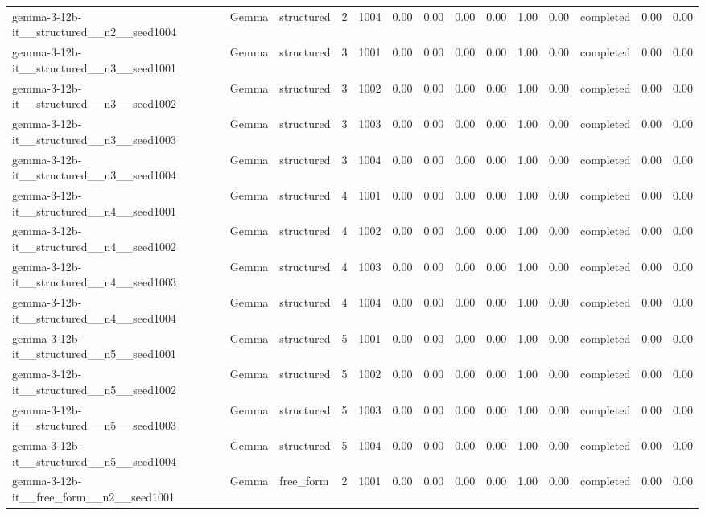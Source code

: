 \begin{longtable}{lllrrrrrrrrlrr}
gemma-3-12b-it\_\_structured\_\_n2\_\_seed1004 & Gemma & structured & 2 & 1004 & 0.00 & 0.00 & 0.00 & 0.00 & 1.00 & 0.00 & completed & 0.00 & 0.00 \\
gemma-3-12b-it\_\_structured\_\_n3\_\_seed1001 & Gemma & structured & 3 & 1001 & 0.00 & 0.00 & 0.00 & 0.00 & 1.00 & 0.00 & completed & 0.00 & 0.00 \\
gemma-3-12b-it\_\_structured\_\_n3\_\_seed1002 & Gemma & structured & 3 & 1002 & 0.00 & 0.00 & 0.00 & 0.00 & 1.00 & 0.00 & completed & 0.00 & 0.00 \\
gemma-3-12b-it\_\_structured\_\_n3\_\_seed1003 & Gemma & structured & 3 & 1003 & 0.00 & 0.00 & 0.00 & 0.00 & 1.00 & 0.00 & completed & 0.00 & 0.00 \\
gemma-3-12b-it\_\_structured\_\_n3\_\_seed1004 & Gemma & structured & 3 & 1004 & 0.00 & 0.00 & 0.00 & 0.00 & 1.00 & 0.00 & completed & 0.00 & 0.00 \\
gemma-3-12b-it\_\_structured\_\_n4\_\_seed1001 & Gemma & structured & 4 & 1001 & 0.00 & 0.00 & 0.00 & 0.00 & 1.00 & 0.00 & completed & 0.00 & 0.00 \\
gemma-3-12b-it\_\_structured\_\_n4\_\_seed1002 & Gemma & structured & 4 & 1002 & 0.00 & 0.00 & 0.00 & 0.00 & 1.00 & 0.00 & completed & 0.00 & 0.00 \\
gemma-3-12b-it\_\_structured\_\_n4\_\_seed1003 & Gemma & structured & 4 & 1003 & 0.00 & 0.00 & 0.00 & 0.00 & 1.00 & 0.00 & completed & 0.00 & 0.00 \\
gemma-3-12b-it\_\_structured\_\_n4\_\_seed1004 & Gemma & structured & 4 & 1004 & 0.00 & 0.00 & 0.00 & 0.00 & 1.00 & 0.00 & completed & 0.00 & 0.00 \\
gemma-3-12b-it\_\_structured\_\_n5\_\_seed1001 & Gemma & structured & 5 & 1001 & 0.00 & 0.00 & 0.00 & 0.00 & 1.00 & 0.00 & completed & 0.00 & 0.00 \\
gemma-3-12b-it\_\_structured\_\_n5\_\_seed1002 & Gemma & structured & 5 & 1002 & 0.00 & 0.00 & 0.00 & 0.00 & 1.00 & 0.00 & completed & 0.00 & 0.00 \\
gemma-3-12b-it\_\_structured\_\_n5\_\_seed1003 & Gemma & structured & 5 & 1003 & 0.00 & 0.00 & 0.00 & 0.00 & 1.00 & 0.00 & completed & 0.00 & 0.00 \\
gemma-3-12b-it\_\_structured\_\_n5\_\_seed1004 & Gemma & structured & 5 & 1004 & 0.00 & 0.00 & 0.00 & 0.00 & 1.00 & 0.00 & completed & 0.00 & 0.00 \\
gemma-3-12b-it\_\_free\_form\_\_n2\_\_seed1001 & Gemma & free\_form & 2 & 1001 & 0.00 & 0.00 & 0.00 & 0.00 & 1.00 & 0.00 & completed & 0.00 & 0.00 \\

\end{longtable}
